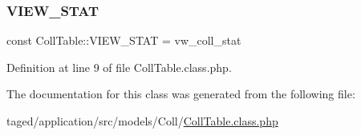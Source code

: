 \subsubsection{\texorpdfstring{V\+I\+E\+W\+\_\+\+S\+T\+AT}{VIEW\_STAT}}
{\footnotesize\ttfamily const Coll\+Table\+::\+V\+I\+E\+W\+\_\+\+S\+T\+AT = \textquotesingle{}vw\+\_\+coll\+\_\+stat\textquotesingle{}}



Definition at line 9 of file Coll\+Table.\+class.\+php.



The documentation for this class was generated from the following file\+:\begin{DoxyCompactItemize}
\item 
taged/application/src/models/\+Coll/\hyperlink{_coll_table_8class_8php}{Coll\+Table.\+class.\+php}\end{DoxyCompactItemize}
